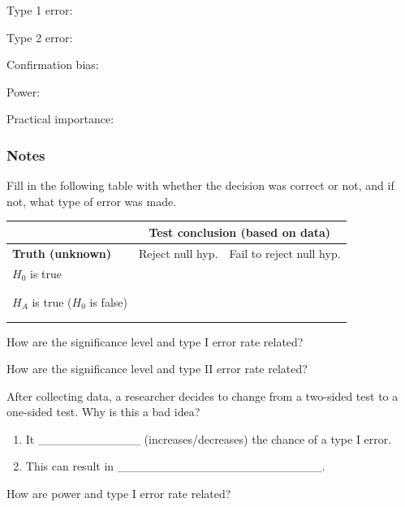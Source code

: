 \documentclass[
]{report}
\newcommand{\rgs}{\vspace{12pt}} %
\begin{document}
Type 1 error:
\rgs

Type 2 error:
\rgs

Confirmation bias:
\rgs

Power:
\rgs

Practical importance:
\rgs

\hypertarget{notes-22}{%
\subsubsection*{Notes}\label{notes-22}}

Fill in the following table with whether the decision was correct or not, and if not, what type of error was made.

\begin{center}
\begin{tabular}{|p{2in}|p{2in}|p{2in}|}
\hline
 & \multicolumn{2}{|c|}{\textbf{Test conclusion (based on data)}} \\ \hline
 \textbf{Truth (unknown)} & Reject null hyp. & Fail to reject null hyp. \\ \hline
 $H_0$ is true && \\ 
   & & \\ 
   & & \\ \hline
 $H_A$ is true ($H_0$ is false)  && \\ 
   & & \\ 
   & & \\ \hline
\end{tabular}
\end{center}

\rgs

How are the significance level and type I error rate related?
\rgs

How are the significance level and type II error rate related?
\rgs

After collecting data, a researcher decides to change from a two-sided test to a one-sided test. Why is this a bad idea?

\begin{enumerate}
\def\labelenumi{\arabic{enumi}.}
\item
  It \_\_\_\_\_\_\_\_\_\_\_\_ (increases/decreases) the chance of a type I error.
\item
  This can result in \_\_\_\_\_\_\_\_\_\_\_\_\_\_\_\_\_\_\_\_\_\_\_\_.
  \rgs
\end{enumerate}

How are power and type I error rate related?
\rgs
\end{document}

